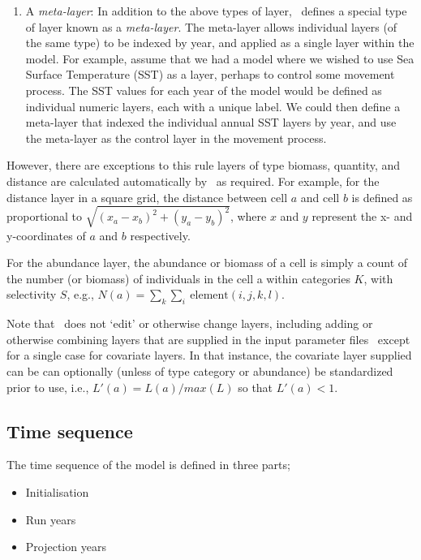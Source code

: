 \begin{enumerate}
\item A \emph{meta-layer\label{meta-layer}}: In addition to the above types of layer, \SPM\ defines a special type of layer known as a \emph{meta-layer}. The meta-layer allows individual layers (of the same type) to be indexed by year, and applied as a single layer within the model. For example, assume that we had a model where we wished to use Sea Surface Temperature (SST) as a layer, perhaps to control some movement process. The SST values for each year of the model would be defined as individual numeric layers, each with a unique label. We could then define a meta-layer that indexed the individual annual SST layers by year, and use the meta-layer as the control layer in the movement process. 
\end{enumerate}

However, there are  exceptions to this rule \textemdash layers of type biomass, quantity, and distance are calculated automatically by \SPM\ as required. For example, for the distance layer in a square grid, the distance between cell $a$ and cell $b$ is defined as proportional to $\sqrt{(x_a-x_b)^2 +(y_a-y_b)^2}$, where $x$ and $y$ represent the x- and y-coordinates of $a$ and $b$ respectively.

For the abundance layer, the abundance or biomass of a cell is simply a count of the number (or biomass) of individuals in the cell a within categories $K$, with selectivity $S$, e.g., $N(a)=\sum_k \sum_i \ \text{element}(i,j,k,l)$.

Note that \SPM\ does not `edit' or otherwise change layers, including adding or otherwise combining layers that are supplied in the input parameter files \textemdash\ except for a single case for covariate layers. In that instance, the covariate layer supplied can be can optionally (unless of type category or abundance) be standardized prior to use, i.e., $L'(a)=L(a)/max(L)$ so that $L'(a) < 1$.

\subsection{Time sequence}

The time sequence of the model is defined in three parts;
\begin{itemize}
  \item Initialisation 
  \item Run years
  \item Projection years
\end{itemize}

